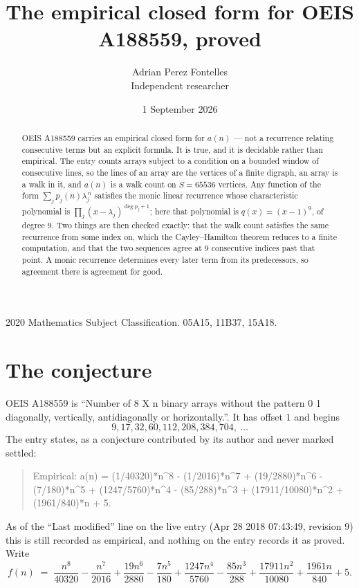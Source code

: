 \documentclass[11pt,a4paper]{article}
\title{The empirical closed form for OEIS A188559, proved}
\author{Adrian Perez Fontelles\\ \small Independent researcher}
\date{1 September 2026}
\theoremstyle{plain}
\theoremstyle{definition}
\begin{document}
\maketitle

\begin{abstract}
OEIS A188559 carries an empirical closed form for $a(n)$ --- not a recurrence relating
consecutive terms but an explicit formula. It is true, and it is decidable rather than
empirical. The entry counts arrays subject to a condition on a bounded window of consecutive lines, so the lines of an array are the
vertices of a finite digraph, an array is a walk in it, and $a(n)$ is a walk count on
$S=65536$ vertices. Any function of the form $\sum_j p_j(n)\lambda_j^{\,n}$ satisfies the
monic linear recurrence whose characteristic polynomial is
$\prod_j(x-\lambda_j)^{\deg p_j+1}$; here that polynomial is $q(x)=(x-1)^{9}$, of degree
$9$. Two things are then checked exactly: that the walk count satisfies the same
recurrence from some index on, which the Cayley--Hamilton theorem reduces to a finite
computation, and that the two sequences agree at $9$ consecutive indices past that
point. A monic recurrence determines every later term from its predecessors, so agreement
there is agreement for good.
\end{abstract}

\noindent\small 2020 Mathematics Subject Classification. 05A15, 11B37, 15A18.\normalsize

\section{The conjecture}

OEIS A188559 is ``Number of 8 X n binary arrays without the pattern 0 1 diagonally, vertically, antidiagonally or horizontally.''. It has offset $1$ and begins
\[
9, 17, 32, 60, 112, 208, 384, 704,\ \dots
\]
The entry states, as a conjecture contributed by its author and never marked settled:
\begin{quote}
Empirical: a(n) = (1/40320)*n\^{}8 - (1/2016)*n\^{}7 + (19/2880)*n\^{}6 - (7/180)*n\^{}5 + (1247/5760)*n\^{}4 - (85/288)*n\^{}3 + (17911/10080)*n\^{}2 + (1961/840)*n + 5.
\end{quote}
As of the ``Last modified'' line on the live entry (Apr 28 2018 07:43:49, revision 9) this is still
recorded as empirical, and nothing on the entry records it as proved. Write
\[
f(n)\;=\;\frac{n^{8}}{40320} - \frac{n^{7}}{2016} + \frac{19 n^{6}}{2880} - \frac{7 n^{5}}{180} + \frac{1247 n^{4}}{5760} - \frac{85 n^{3}}{288} + \frac{17911 n^{2}}{10080} + \frac{1961 n}{840} + 5.
\]
\end{document}

